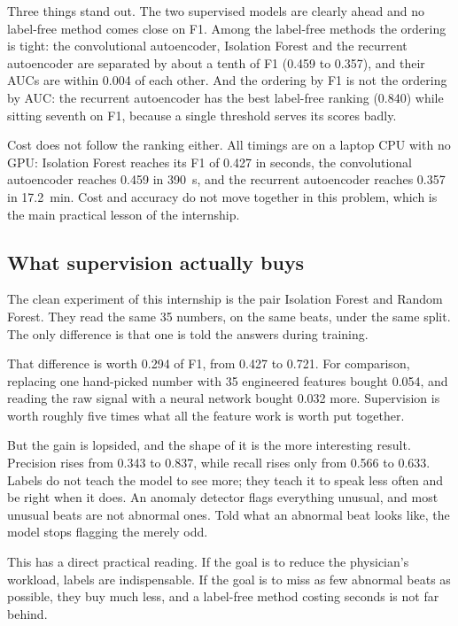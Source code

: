 \documentclass[a4paper, 12pt]{article}
\begin{document}
Three things stand out. The two supervised models are clearly ahead and no
label-free method comes close on F1. Among the label-free methods the ordering is
tight: the convolutional autoencoder, Isolation Forest and the recurrent
autoencoder are separated by about a tenth of F1 (\num{0.459} to \num{0.357}),
and their AUCs are within
\num{0.004} of each other. And the ordering by F1 is not the ordering by AUC: the
recurrent autoencoder has the best label-free ranking (\num{0.840}) while sitting
seventh on F1, because a single threshold serves its scores badly.

Cost does not follow the ranking either. All timings are on a laptop CPU with no
GPU: Isolation Forest reaches its F1 of \num{0.427} in seconds, the convolutional
autoencoder reaches \num{0.459} in \SI{390}{\second}, and the recurrent
autoencoder reaches \num{0.357} in \SI{17.2}{\minute}. Cost and accuracy do not
move together in this problem, which is the main practical lesson of the
internship.

\subsection{What supervision actually buys} \label{subsec:supervision-buys}

The clean experiment of this internship is the pair Isolation Forest and Random
Forest. They read the same 35 numbers, on the same beats, under the same split. The
only difference is that one is told the answers during training.

That difference is worth \num{0.294} of F1, from \num{0.427} to \num{0.721}. For
comparison, replacing one hand-picked number with 35 engineered features bought
\num{0.054}, and reading the raw signal with a neural network bought \num{0.032}
more. Supervision is worth roughly five times what all the feature work is worth
put together.

But the gain is lopsided, and the shape of it is the more interesting result.
Precision rises from \num{0.343} to \num{0.837}, while recall rises only from
\num{0.566} to \num{0.633}. Labels do not teach the model to see more; they teach
it to speak less often and be right when it does. An anomaly detector flags
everything unusual, and most unusual beats are not abnormal ones. Told what an
abnormal beat looks like, the model stops flagging the merely odd.

This has a direct practical reading. If the goal is to reduce the physician's
workload, labels are indispensable. If the goal is to miss as few abnormal beats as
possible, they buy much less, and a label-free method costing seconds is not far
behind.
\end{document}
